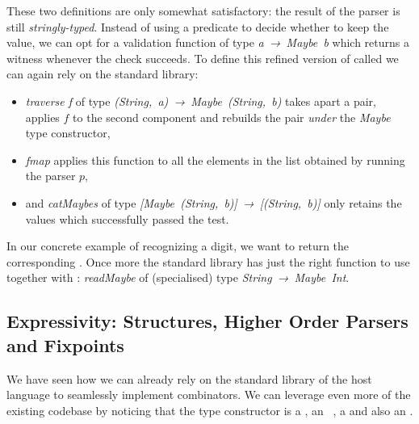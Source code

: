 
These two definitions are only somewhat satisfactory: the
result of the  parser is still \emph{stringly-typed}.
Instead of using a predicate to decide whether to keep the
value, we can opt for a validation function of type
\mbox{\textit{a → Maybe b}} which returns a witness whenever the
check succeeds. To define this refined version of 
called  we can again rely on the standard library:


\begin{itemize}
  \item \textit{traverse f} of type \mbox{\textit{(String, a) → Maybe (String, b)}}
    takes apart a pair, applies $f$ to the second component and rebuilds the pair
    \emph{under} the \textit{Maybe} type constructor,
  \item \textit{fmap} applies this function to all the elements in the list obtained
    by running the parser $p$,
  \item and \textit{catMaybes} of type \mbox{\textit{[Maybe (String, b)] → [(String, b)]}}
    only retains the values which successfully passed the test.
\end{itemize}

In our concrete example of recognizing a digit, we want to return the
corresponding . Once more the standard library has just the
right function to use together with : \textit{readMaybe}
of (specialised) type \mbox{\textit{String → Maybe Int}}.



\subsection{Expressivity: Structures, Higher Order Parsers and Fixpoints}


We have seen how we can already rely on the standard library
of the host language to seamlessly implement combinators.
We can leverage even more of the existing codebase by noticing
that the type constructor  is a ,
an ~\cite{mcbride2008applicative}, a 
and also an .

